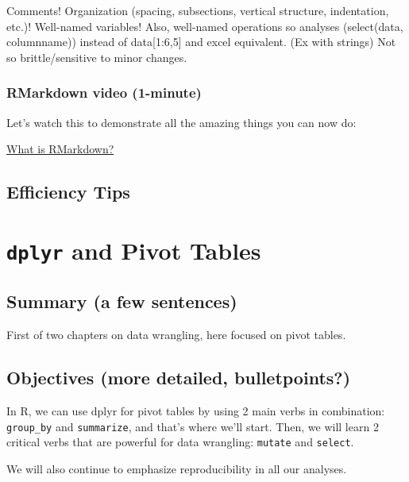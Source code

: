 \documentclass[]{book}
\begin{document}
Comments! Organization (spacing, subsections, vertical structure, indentation, etc.)! Well-named variables! Also, well-named operations so analyses (select(data, columnname)) instead of data{[}1:6,5{]} and excel equivalent. (Ex with strings)
Not so brittle/sensitive to minor changes.

\hypertarget{rmarkdown-video-1-minute}{%
\subsection{RMarkdown video (1-minute)}\label{rmarkdown-video-1-minute}}

Let's watch this to demonstrate all the amazing things you can now do:

\href{https://vimeo.com/178485416}{What is RMarkdown?}

\hypertarget{efficiency-tips-2}{%
\section{Efficiency Tips}\label{efficiency-tips-2}}

\hypertarget{pivot}{%
\chapter{\texorpdfstring{\texttt{dplyr} and Pivot Tables}{dplyr and Pivot Tables}}\label{pivot}}

\hypertarget{summary-a-few-sentences-2}{%
\section{Summary (a few sentences)}\label{summary-a-few-sentences-2}}

First of two chapters on data wrangling, here focused on pivot tables.

\hypertarget{objectives-more-detailed-bulletpoints-2}{%
\section{Objectives (more detailed, bulletpoints?)}\label{objectives-more-detailed-bulletpoints-2}}

In R, we can use dplyr for pivot tables by using 2 main verbs in combination: \texttt{group\_by} and \texttt{summarize}, and that's where we'll start. Then, we will learn 2 critical verbs that are powerful for data wrangling: \texttt{mutate} and \texttt{select}.

We will also continue to emphasize reproducibility in all our analyses.
\end{document}
